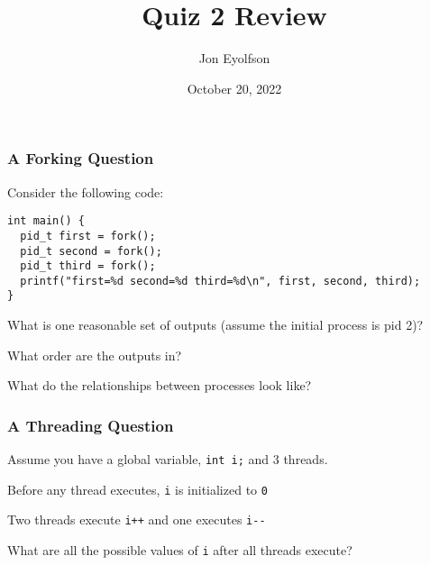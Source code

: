 

\title{Quiz 2 Review}
\author{Jon Eyolfson}
\date{October 20, 2022}


  \begin{frame}
    \titlepage
  \end{frame}

  \begin{frame}[fragile]
    \frametitle{A Forking Question}

    Consider the following code:

    \begin{lstlisting}
int main() {
  pid_t first = fork();
  pid_t second = fork();
  pid_t third = fork();
  printf("first=%d second=%d third=%d\n", first, second, third);
}
    \end{lstlisting}

    \vspace{2em}

    What is one reasonable set of outputs (assume the initial process is pid 2)?

    \vspace{1em}

    What order are the outputs in?

    \vspace{1em}

    What do the relationships between processes look like?
  \end{frame}

  \begin{frame}[fragile]
    \frametitle{A Threading Question}

    Assume you have a global variable, \lstinline!int i;! and 3 threads.

    \vspace{1em}

    Before any thread executes, \lstinline!i! is initialized to \lstinline!0!

    \vspace{1em}

    Two threads execute \lstinline!i++! and one executes \lstinline!i--!

    \vspace{2em}

    What are all the possible values of \lstinline!i! after all threads execute?
  \end{frame}

